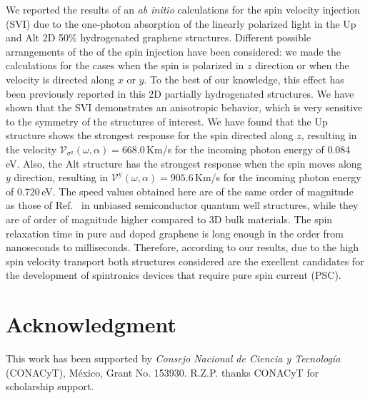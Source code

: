 \documentclass[floatfix,prb,aps,superscriptaddress,showpacs,11pt,preprint,letterpaper]{revtex4}
\begin{document}
We reported the results of an \emph{ab initio} calculations for the spin
velocity injection (SVI) due to the one-photon absorption of the linearly
polarized light in the Up and Alt 2D 50\% hydrogenated graphene structures.
Different possible arrangements of the of the spin injection have been
considered: we made the calculations for the cases when the spin is polarized
in $z$ direction or when the velocity is directed along $x$ or $y$. To the best
of our knowledge, this effect  has been previously reported in this  2D
partially hydrogenated structures. We have shown that the  SVI demonstrates an
anisotropic behavior, which is very sensitive to the symmetry of the structures
of interest. We have found that the Up structure shows the strongest response
for the spin directed along $z$, resulting in the velocity
$\mathcal{V}_{\sigma^{\mathrm{z}}} (\omega,\alpha) = 668.0$\,Km/s for the
incoming photon energy of 0.084\,eV. Also, the Alt structure has the strongest
response when the spin moves along $y$ direction, resulting in
$\mathcal{V}^{\mathrm{y}} (\omega,\alpha) = 905.6$\,Km/s for the incoming
photon energy of 0.720\,eV. The speed values obtained here are of the same
order of magnitude as those of Ref.~ in unbiased
semiconductor quantum well structures, while they are of order of magnitude
higher compared to 3D bulk materials. The spin relaxation time in pure and
doped graphene is long enough in the order from nanoseconds to milliseconds.
\cite{wojtaszekPRB13,ertlerPRB09} Therefore, according to our results, due to
the high spin velocity transport both structures considered are the excellent
candidates for the development of spintronics devices that require pure spin
current (PSC).

\section{Acknowledgment}

This work has been supported by \emph{Consejo Nacional de Ciencia y
Tecnolog\'ia} (CONACyT), M\'exico, Grant No. 153930.
R.Z.P. thanks CONACyT for scholarship support.

\end{document}
